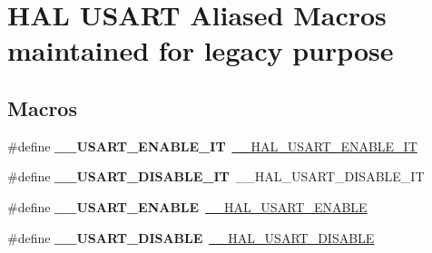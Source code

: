 \hypertarget{group___h_a_l___u_s_a_r_t___aliased___macros}{}\section{H\+AL U\+S\+A\+RT Aliased Macros maintained for legacy purpose}
\label{group___h_a_l___u_s_a_r_t___aliased___macros}
\subsection*{Macros}
\begin{DoxyCompactItemize}
\item 
\#define {\bfseries \+\_\+\+\_\+\+U\+S\+A\+R\+T\+\_\+\+E\+N\+A\+B\+L\+E\+\_\+\+IT}~\hyperlink{group___u_s_a_r_t___exported___macros_ga2258521c741456b4254064958ca7ef51}{\+\_\+\+\_\+\+H\+A\+L\+\_\+\+U\+S\+A\+R\+T\+\_\+\+E\+N\+A\+B\+L\+E\+\_\+\+IT}\hypertarget{group___h_a_l___u_s_a_r_t___aliased___macros_gab99081ba6bb70f397ab2def3f644c3c1}{}\label{group___h_a_l___u_s_a_r_t___aliased___macros_gab99081ba6bb70f397ab2def3f644c3c1}

\item 
\#define {\bfseries \+\_\+\+\_\+\+U\+S\+A\+R\+T\+\_\+\+D\+I\+S\+A\+B\+L\+E\+\_\+\+IT}~\+\_\+\+\_\+\+H\+A\+L\+\_\+\+U\+S\+A\+R\+T\+\_\+\+D\+I\+S\+A\+B\+L\+E\+\_\+\+IT\hypertarget{group___h_a_l___u_s_a_r_t___aliased___macros_ga12ae7c59b7d95f0f8606fca7bba57db8}{}\label{group___h_a_l___u_s_a_r_t___aliased___macros_ga12ae7c59b7d95f0f8606fca7bba57db8}

\item 
\#define {\bfseries \+\_\+\+\_\+\+U\+S\+A\+R\+T\+\_\+\+E\+N\+A\+B\+LE}~\hyperlink{group___u_s_a_r_t___exported___macros_ga60e106d6d610ea5fa1ab2d5ca079a8cf}{\+\_\+\+\_\+\+H\+A\+L\+\_\+\+U\+S\+A\+R\+T\+\_\+\+E\+N\+A\+B\+LE}\hypertarget{group___h_a_l___u_s_a_r_t___aliased___macros_gae03c01e0ee50608e887842bacbf5b361}{}\label{group___h_a_l___u_s_a_r_t___aliased___macros_gae03c01e0ee50608e887842bacbf5b361}

\item 
\#define {\bfseries \+\_\+\+\_\+\+U\+S\+A\+R\+T\+\_\+\+D\+I\+S\+A\+B\+LE}~\hyperlink{group___u_s_a_r_t___exported___macros_ga8cc760b7a382db42655d21a5edbfc227}{\+\_\+\+\_\+\+H\+A\+L\+\_\+\+U\+S\+A\+R\+T\+\_\+\+D\+I\+S\+A\+B\+LE}\hypertarget{group___h_a_l___u_s_a_r_t___aliased___macros_gac894c090835b348469f36bfed6e78fbd}{}\label{group___h_a_l___u_s_a_r_t___aliased___macros_gac894c090835b348469f36bfed6e78fbd}


\end{DoxyCompactItemize}
